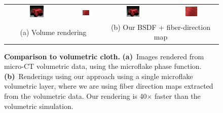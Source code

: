 \begin{figure}[t]
	\centering
	\addtolength{\tabcolsep}{-3.5pt}
	\begin{tabular}{cccc}
		\includegraphics[width=0.24\textwidth]{img/results/gabardine_ref.jpg} &
		\includegraphics[width=0.24\textwidth]{img/results/gabardine_ref_inset_128spp.jpg} &
		\includegraphics[width=0.24\textwidth]{img/results/gabardine.jpg} &
		\includegraphics[width=0.24\textwidth]{img/results/gabardine_inset_512spp.jpg} \\
		\multicolumn{2}{c}{(a) Volume rendering} & \multicolumn{2}{c}{(b) Our BSDF + fiber-direction map}
	\end{tabular}
	\caption{\label{fig:redcloth}
		\textbf{Comparison to volumetric cloth.} \textbf{(a)}~Images rendered from micro-CT volumetric data, using the microflake phase function. \textbf{(b)}~Renderings using our approach using a single microflake volumetric layer, where we are using fiber direction maps extracted from the volumetric data. Our rendering is 40$\times$ faster than the volumetric simulation.
	}
\end{figure} 